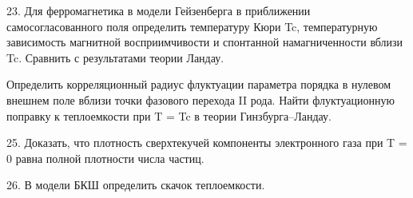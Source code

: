 \documentclass[a4paper,12pt]{article} %
\begin{document}
\begin{ttask}

23. Для ферромагнетика в модели Гейзенберга в приближении самосогласованного поля определить температуру Кюри Tc, 
температурную зависимость магнитной восприимчивости  и спонтанной намагниченности вблизи Tc. 
Сравнить с результатами теории Ландау.





















\end{ttask}



\begin{ttask}

Определить корреляционный радиус флуктуации параметра порядка в нулевом внешнем поле вблизи точки фазового перехода II рода. Найти флуктуационную поправку к теплоемкости при T = Tc в теории Гинзбурга–Ландау.



















\end{ttask}





\begin{ttask}

25. Доказать, что плотность сверхтекучей компоненты электронного газа при T = 0 равна полной плотности числа частиц.  

















\end{ttask}


\begin{ttask}

26. В модели БКШ определить скачок теплоемкости.















\end{ttask}
\end{document}
